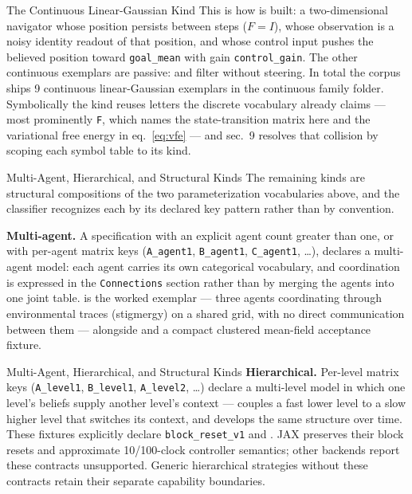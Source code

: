 \documentclass[
  ignorenonframetext,
]{beamer}
\begin{document}
\begin{frame}{The Continuous Linear-Gaussian
Kind}
This is how
 is built:
a two-dimensional navigator whose position persists between steps
(\(F = I\)), whose observation is a noisy identity readout of that
position, and whose control input pushes the believed position toward
\texttt{goal\_mean} with gain \texttt{control\_gain}. The other
continuous exemplars are passive: 
and  filter without steering. In total
the corpus ships 9 continuous linear-Gaussian exemplars in the
continuous family folder. Symbolically the kind reuses letters the
discrete vocabulary already claims --- most prominently \texttt{F},
which names the state-transition matrix here and the variational free
energy in eq.~\ref{eq:vfe} --- and sec.~9
resolves that collision by scoping each symbol table to its kind.
\end{frame}

\begin{frame}{Multi-Agent, Hierarchical, and
Structural Kinds}
\protect{}\label{sec:structural_variants}
The remaining kinds are structural compositions of the two
parameterization vocabularies above, and the classifier recognizes each
by its declared key pattern rather than by convention.

\textbf{Multi-agent.} A specification with an explicit agent count
greater than one, or with per-agent matrix keys (\texttt{A\_agent1},
\texttt{B\_agent1}, \texttt{C\_agent1}, \ldots), declares a multi-agent
model: each agent carries its own categorical vocabulary, and
coordination is expressed in the \texttt{Connections} section rather
than by merging the agents into one joint table.
 is the worked
exemplar --- three agents coordinating through environmental traces
(stigmergy) on a shared grid, with no direct communication between them
--- alongside  and a compact
clustered mean-field acceptance fixture.

\end{frame}

\begin{frame}{Multi-Agent, Hierarchical, and
Structural Kinds}
\textbf{Hierarchical.} Per-level matrix keys (\texttt{A\_level1},
\texttt{B\_level1}, \texttt{A\_level2}, \ldots) declare a multi-level
model in which one level's beliefs supply another level's context ---
 couples a
fast lower level to a slow higher level that switches its context, and
 develops the same structure over time.
These fixtures explicitly declare \texttt{block\_reset\_v1} and
. JAX preserves their block resets
and approximate 10/100-clock controller semantics; other backends report
these contracts unsupported. Generic hierarchical strategies without
these contracts retain their separate capability boundaries.

\end{frame}
\end{document}
